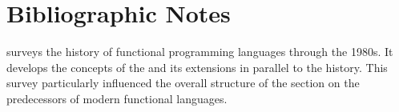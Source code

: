 \label{functional:history}




\section{Bibliographic Notes}
\citet{Hudak:Conception:1989} surveys the history of functional programming languages through the 1980s. It develops the concepts of the \lambdacalc and its extensions in parallel to the history. This survey particularly influenced the overall structure of the section on the predecessors of modern functional languages.

